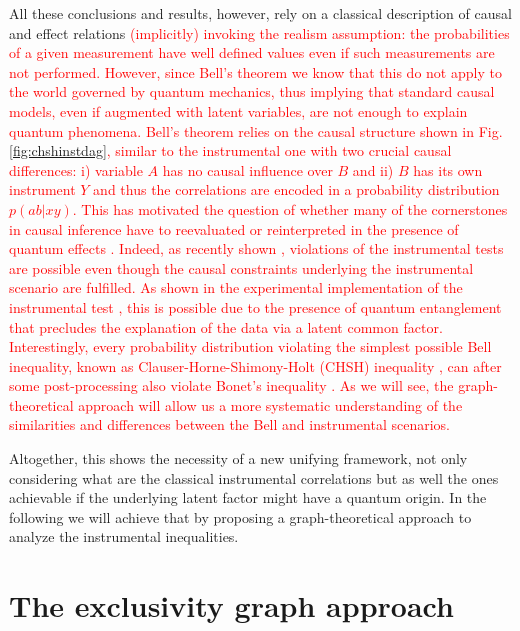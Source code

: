 \documentclass[letterpaper]{article}
\begin{document}
All these conclusions and results, however, rely on a classical description of
causal and effect relations \textcolor{red}{(implicitly) invoking the realism assumption: the probabilities of a given measurement have well defined values even if such measurements are not performed. However, since Bell's theorem \cite{bell1964} we know that this do not apply to the world governed by quantum mechanics, thus implying that standard causal models, even if augmented with latent variables, are not enough to explain quantum phenomena. Bell's theorem relies on the causal structure shown in Fig. \ref{fig:chshinstdag}, similar to the instrumental one with two crucial causal differences: i) variable $A$ has no causal influence over $B$ and ii) $B$ has its own instrument $Y$ and thus the correlations are encoded in a probability distribution $p(ab \vert xy)$. This has motivated the question of whether many of the cornerstones in causal inference have to
reevaluated or reinterpreted in the presence of quantum effects \cite{ried2015,Costa2016,Wolfe2016}. Indeed, as recently shown \cite{chaves2018}, violations of the instrumental tests are possible even though the causal constraints underlying the instrumental scenario are fulfilled. As shown in the experimental implementation of the instrumental
test \cite{chaves2018}, this is possible due to the presence of quantum entanglement that precludes the explanation of the data via a latent common factor. Interestingly, every probability distribution violating the simplest possible Bell inequality, known as Clauser-Horne-Shimony-Holt (CHSH) inequality \cite{CHSH}, can after some post-processing also violate Bonet's inequality \cite{himbeeck2018}. As we will see, the graph-theoretical approach will allow us a more systematic understanding of the similarities and differences between the Bell and instrumental scenarios.} 

Altogether, this shows the necessity of a new unifying framework, not only
considering what are the classical instrumental correlations but as well the
ones achievable if the underlying latent factor might have a quantum origin. In
the following we will achieve that by proposing a graph-theoretical approach to analyze the instrumental inequalities.

\section{The exclusivity graph approach}
\end{document}

